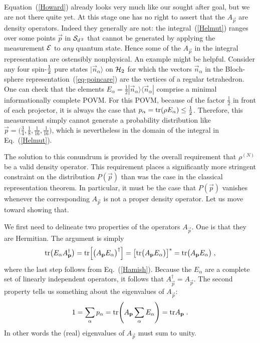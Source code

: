 Equation~(\ref{Howard}) already looks very much like our sought
after goal, but we are not there quite yet.  At this stage one has no
right to assert that the $A_{\vec{p}}$ are density operators. Indeed
they generally are not:  the integral~(\ref{Helmut}) ranges over
some points $\vec{p}$ in ${\cal S}_{d^{\,2}}$ that cannot be
generated by applying the measurement $\cal E$ to {\it any\/}
quantum state.  Hence some of the $A_{\vec{p}}$ in the integral
representation are ostensibly nonphysical.  An example might be
helpful. Consider any four spin-$1\over2$ pure states $|\vec
n_\alpha\rangle$ on ${\cal H}_2$ for which the vectors $\vec
n_\alpha$ in the Bloch-sphere representation~(\ref{eq-poincare}) are
the vertices of a regular tetrahedron.  One can check that the
elements $E_\alpha=\frac{1}{2}|\vec n_\alpha\rangle\langle\vec
n_\alpha|$ comprise a minimal informationally complete POVM. For
this POVM, because of the factor $\frac{1}{2}$ in front of each
projector, it is always the case that $p_\alpha={\rm tr}(\rho
E_\alpha)\le\frac{1}{2}$. Therefore, this measurement simply cannot
generate a probability distribution like
$\vec{p}=\big(\frac{3}{4},\frac{1}{8},\frac{1}{16},\frac{1}{16}\big)$,
which is nevertheless in the domain of the integral in
Eq.~(\ref{Helmut}).

The solution to this conundrum is provided by the overall requirement
that $\rho^{(N)}$ be a valid density operator.  This requirement
places a significantly more stringent constraint on the distribution
$P(\vec{p})$ than was the case in the classical representation
theorem.  In particular, it must be the case that $P(\vec{p})$
vanishes whenever the corresponding $A_{\vec{p}}$ is not a proper
density operator.  Let us move toward showing that.

We first need to delineate two properties of the operators
$A_{\vec{p}}$.  One is that they are Hermitian. The argument is
simply
\begin{equation}
{\rm tr}\big(E_\alpha A_{\vec{p}}^\dagger\big) = {\rm
tr}\!\left[\big(A_{\vec{p}}E_\alpha\big)^\dagger\right] = \big[{\rm
tr}\big(A_{\vec{p}}E_\alpha\big)\big]^* = {\rm
tr}\big(A_{\vec{p}}E_\alpha\big)\;,
\end{equation}
where the last step follows from Eq.~(\ref{Hamish}).  Because the
$E_\alpha$ are a complete set of linearly independent operators,
it follows that $A_{\vec{p}}^\dagger=A_{\vec{p}}$.  The second
property tells us something about the eigenvalues of
$A_{\vec{p}}$:
\begin{equation}
1=\sum_\alpha p_\alpha={\rm tr}\!\left(A_{\vec{p}}\sum_\alpha
E_\alpha\right)={\rm tr}A_{\vec{p}}\;.
\label{HepPlease}
\end{equation}
In other words the (real) eigenvalues of $A_{\vec{p}}$ must sum to
unity.

